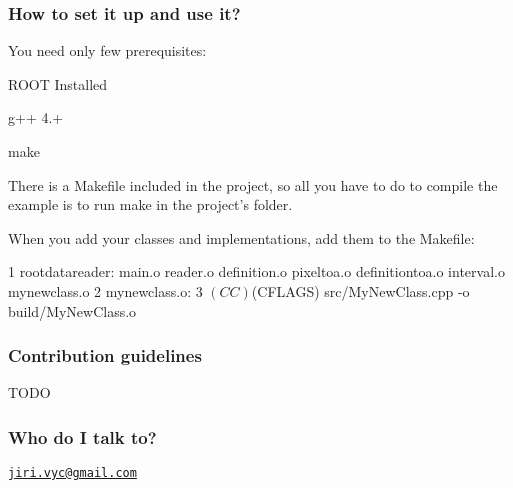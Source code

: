 \subsubsection*{How to set it up and use it?}

You need only few prerequisites\+:


\begin{DoxyItemize}
\item R\+O\+O\+T Installed
\item g++ 4.+
\item make
\end{DoxyItemize}

There is a Makefile included in the project, so all you have to do to compile the example is to run {\ttfamily make} in the project's folder.

When you add your classes and implementations, add them to the Makefile\+:


\begin{DoxyCode}
1 rootdatareader: main.o reader.o definition.o pixeltoa.o definitiontoa.o interval.o mynewclass.o
2 mynewclass.o:
3     $(CC) $(CFLAGS) src/MyNewClass.cpp -o build/MyNewClass.o
\end{DoxyCode}


\subsubsection*{Contribution guidelines}


\begin{DoxyItemize}
\item T\+O\+D\+O
\end{DoxyItemize}

\subsubsection*{Who do I talk to?}

\href{mailto:jiri.vyc@gmail.com}{\tt jiri.\+vyc@gmail.\+com} 